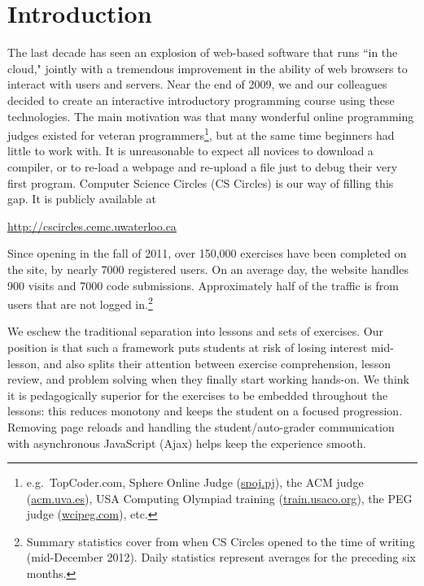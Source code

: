 \documentclass{article}
\newcommand{\usanon}[2]{#1}
\begin{document}
\section{Introduction}
The last decade has seen an explosion of web-based software that runs ``in the cloud," jointly with a tremendous improvement in the ability of web browsers to interact with users and servers. Near the end of 2009, we and our colleagues decided to create an interactive introductory programming course using these technologies. The main motivation was that many wonderful online programming judges existed for veteran programmers\footnote{e.g.~TopCoder.com, Sphere Online Judge (\url{spoj.pj}), the ACM judge (\url{acm.uva.es}), USA Computing Olympiad training (\url{train.usaco.org}), the PEG judge (\url{wcipeg.com}), etc.}, but at the same time beginners had little to work with. It is unreasonable to expect all novices to download a compiler, or to re-load a webpage and re-upload a file just to debug their very first program. Computer Science Circles (CS Circles) is our way of filling this gap. It is publicly available at
\begin{center}
\usanon{\url{http://cscircles.cemc.uwaterloo.ca}}{[[Normal URL redacted. You are welcome to visit it at \url{http://bit.ly/K4x83V}; this will reveal our university's name. Beware that the ``Thanks" page there has some of our names listed.]]}
\end{center}
Since opening in the fall of 2011, over 150,000 exercises have been completed on the site, by nearly 7000 registered users. On an average day, the website handles 900 visits and 7000 code submissions. Approximately half of the traffic is from users that are not logged in.\footnote{Summary statistics cover from when CS Circles opened to the time of writing (mid-December 2012). Daily statistics represent averages for the preceding six months.}

We eschew the traditional separation into lessons and sets of exercises. Our position is that such a framework puts students at risk of losing interest mid-lesson, and also splits their attention between exercise comprehension, lesson review, and problem solving when they finally start working hands-on. We think it is pedagogically superior for the exercises to be embedded throughout the lessons: this reduces monotony and keeps the student on a focused progression. Removing page reloads and handling the student/auto-grader communication with asynchronous JavaScript (Ajax) helps keep the experience smooth.
\end{document}
